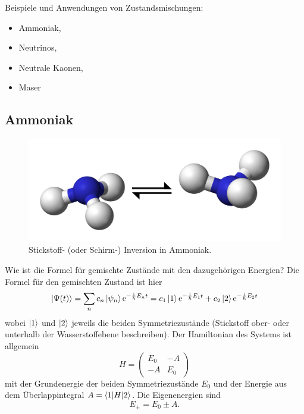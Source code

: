 Beispiele und Anwendungen von Zustandsmischungen:
\begin{itemize}
    \item Ammoniak,
    \item Neutrinos,
    \item Neutrale Kaonen,
    \item Maser
\end{itemize}

\subsection{Ammoniak}

\begin{figure}[H]
    \centering
    \includegraphics[scale=0.3]{img/Nitrogen-inversion-3D-balls (1).png}
    \caption{Stickstoff- (oder Schirm-) Inversion in Ammoniak. }
    \label{fig:my_label}
\end{figure}

\begin{fquestion}{Wie ist die Formel für gemischte Zustände mit den dazugehörigen Energien?}
    Die Formel für den gemischten Zustand ist hier
    \[\ket{\Psi(t)} = \sum_n c_n \ket{\psi_n} \text{e}^{-\frac{\text{i}}{\hbar} E_n t} = c_1 \ket{1} \text{e}^{-\frac{\text{i}}{\hbar} E_1 t} + c_2 \ket{2} \text{e}^{-\frac{\text{i}}{\hbar} E_2 t}\]
    wobei $\ket{1}$ und $\ket{2}$ jeweils die beiden Symmetriezustände (Stickstoff ober- oder unterhalb der Wasserstoffebene beschreiben).
    Der Hamiltonian des Systems ist allgemein
    \[H = \begin{pmatrix} E_0 & -A \\ -A & E_0 \end{pmatrix}\]
    mit der Grundenergie der beiden Symmetriezustände $E_0$ und der Energie aus dem Überlappintegral $A = \braket{1 | H}{2}$.
    Die Eigenenergien sind
    \[E_\pm = E_0 \pm A.\]
\end{fquestion}

